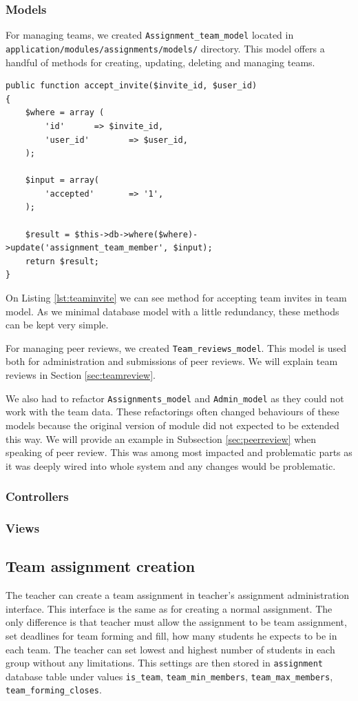 \subsubsection{Models}
For managing teams, we created \texttt{Assignment\_team\_model} located in \texttt{application/modules/assignments/models/} directory. This model offers a handful of methods for creating, updating, deleting and managing teams.

\begin{lstlisting}[caption={Method for accepting team invites},label={lst:teaminvite}]
public function accept_invite($invite_id, $user_id)
{
    $where = array (
        'id'      => $invite_id,
        'user_id'        => $user_id,
    );

    $input = array(
        'accepted'       => '1',
    );

    $result = $this->db->where($where)->update('assignment_team_member', $input);
    return $result;
}
\end{lstlisting}

On Listing \ref{lst:teaminvite} we can see method for accepting team invites in team model. As we minimal database model with a little redundancy, these methods can be kept very simple. 

For managing peer reviews, we created \texttt{Team\_reviews\_model}. This model is used both for administration and submissions of peer reviews. We will explain team reviews in Section \ref{sec:teamreview}.

We also had to refactor \texttt{Assignments\_model} and \texttt{Admin\_model} as they could not work with the team data. These refactorings often changed behaviours of these models because the original version of module did not expected to be extended this way. We will provide an example in Subsection \ref{sec:peerreview} when speaking of peer review. This was among most impacted and problematic parts as it was deeply wired into whole system and any changes would be problematic.

\subsubsection{Controllers}

\subsubsection{Views}

\subsection{Team assignment creation}
The teacher can create a team assignment in teacher's assignment administration interface. This interface is the same as for creating a normal assignment. The only difference is that teacher must allow the assignment to be team assignment, set deadlines for team forming and fill, how many students he expects to be in each team. The teacher can set lowest and highest number of students in each group without any limitations. This settings are then stored in \texttt{assignment} database table under values \texttt{is\_team}, \texttt{team\_min\_members}, \texttt{team\_max\_members}, \texttt{team\_forming\_closes}.

